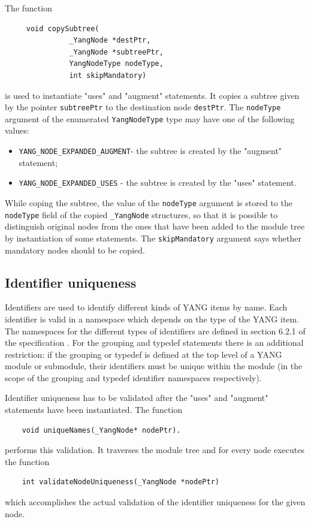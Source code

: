 \documentclass[conference]{IEEEtran}
\begin{document}
The function
\small
\begin{verbatim}
     void copySubtree(
               _YangNode *destPtr, 
               _YangNode *subtreePtr, 
               YangNodeType nodeType, 
               int skipMandatory)
\end{verbatim}
\normalsize
is used to instantiate "uses" and "augment" statements. It copies a subtree given by the pointer \texttt{subtreePtr} to the destination node \texttt{destPtr}.  
The \texttt{nodeType} argument of the enumerated \texttt{YangNodeType} type  may have one of the following values:
\begin{itemize}
\item \texttt{YANG\_NODE\_EXPANDED\_AUGMENT}- the subtree is created by the "augment" statement;
\item \texttt{YANG\_NODE\_EXPANDED\_USES} - the subtree is created by the "uses" statement.
\end{itemize}
While coping the subtree, the value of the \texttt{nodeType} argument is stored to the \texttt{nodeType} field of the copied \texttt{\_YangNode} structures,
so that it is possible to distinguish original nodes from the ones that have been added to the module tree by instantiation of some statements. 
The \texttt{skipMandatory} argument says whether mandatory nodes should to be copied.

\subsection{Identifier uniqueness}
Identifiers are used to identify different kinds of YANG items by name. Each identifier is valid in a namespace which depends on the type of the YANG item.
The namespaces for the different types of identifiers are defined in section 6.2.1 of the specification \cite{bib4}. For the grouping and typedef statements
there is an additional restriction: if the grouping or typedef is defined at the top level of a YANG module or submodule, their identifiers
must be unique within the module (in the scope of the grouping and typedef identifier namespaces respectively).

Identifier uniqueness has to be validated after the "uses" and "augment" statements have been instantiated. The function
\small
\begin{verbatim}
    void uniqueNames(_YangNode* nodePtr).
\end{verbatim}
\normalsize
performs this validation. It traverses the module tree and for every node executes the function  
\small
\begin{verbatim}
    int validateNodeUniqueness(_YangNode *nodePtr)
\end{verbatim}
\normalsize
which accomplishes the actual validation of the identifier uniqueness for the given node. 
\end{document}
